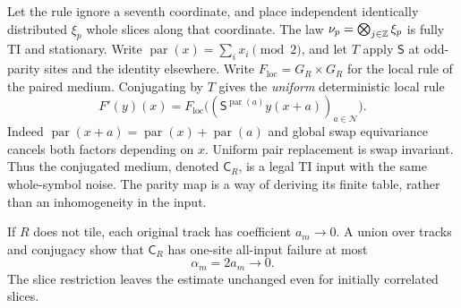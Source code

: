 Let the rule ignore a seventh coordinate, and place independent identically distributed $\xi_p$ whole slices along that coordinate. The law
$\nu_p=\bigotimes_{j\in\mathbb Z}\xi_p$ is fully TI and stationary. Write
$\operatorname{par}(x)=\sum_i x_i\pmod2$, and let $T$ apply $\mathsf S$ at odd-parity sites and the identity elsewhere. Write $F_{\mathrm{loc}}=G_R\times G_R$ for the local rule of the paired medium. Conjugating by $T$ gives the \emph{uniform} deterministic local rule
\begin{equation}\label{eq:gauge}
 F'(y)(x)=F_{\mathrm{loc}}\bigl((\mathsf S^{\operatorname{par}(a)}y(x+a))_{a\in\mathcal N}\bigr).
\end{equation}
Indeed $\operatorname{par}(x+a)=\operatorname{par}(x)+\operatorname{par}(a)$ and global swap equivariance cancels both factors depending on $x$. Uniform pair replacement is swap invariant. Thus the conjugated medium, denoted $\mathsf C_R$, is a legal TI input with the same whole-symbol noise. The parity map is a way of deriving its finite table, rather than an inhomogeneity in the input.

If $R$ does not tile, each original track has coefficient $a_m\to0$. A union over tracks and conjugacy show that $\mathsf C_R$ has one-site all-input failure at most
\begin{equation}\label{eq:alpha}
 \alpha_m=2a_m\longrightarrow0.
\end{equation}
The slice restriction leaves the estimate unchanged even for initially correlated slices.

